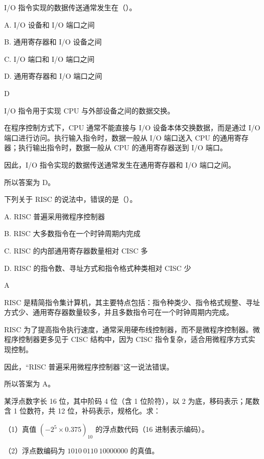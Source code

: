 \begin{question}
I/O 指令实现的数据传送通常发生在（）。

A. I/O 设备和 I/O 端口之间

B. 通用寄存器和 I/O 设备之间

C. I/O 端口和 I/O 端口之间

D. 通用寄存器和 I/O 端口之间
\end{question}

\begin{answer}
D
\end{answer}

\begin{analysisenv}
I/O 指令用于实现 CPU 与外部设备之间的数据交换。

在程序控制方式下，CPU 通常不能直接与 I/O 设备本体交换数据，而是通过 I/O 端口进行访问。执行输入指令时，数据一般从 I/O 端口送入 CPU 的通用寄存器；执行输出指令时，数据一般从 CPU 的通用寄存器送到 I/O 端口。

因此，I/O 指令实现的数据传送通常发生在通用寄存器和 I/O 端口之间。

所以答案为 D。
\end{analysisenv}
\begin{question}
下列关于 RISC 的说法中，错误的是（）。

A. RISC 普遍采用微程序控制器

B. RISC 大多数指令在一个时钟周期内完成

C. RISC 的内部通用寄存器数量相对 CISC 多

D. RISC 的指令数、寻址方式和指令格式种类相对 CISC 少
\end{question}

\begin{answer}
A
\end{answer}

\begin{analysisenv}
RISC 是精简指令集计算机，其主要特点包括：指令种类少、指令格式规整、寻址方式少、通用寄存器数量较多，并且多数指令可在一个时钟周期内完成。

RISC 为了提高指令执行速度，通常采用硬布线控制器，而不是微程序控制器。微程序控制器更多见于 CISC 结构中，因为 CISC 指令复杂，适合用微程序方式实现控制。

因此，“RISC 普遍采用微程序控制器”这一说法错误。

所以答案为 A。
\end{analysisenv}


\begin{question}
某浮点数字长 16 位，其中阶码 4 位（含 1 位阶符），以 2 为底，移码表示；尾数含 1 位数符，共 12 位，补码表示，规格化。求：

（1）真值 $(-2^5 \times 0.375)_{10}$ 的浮点数代码（16 进制表示编码）。

（2）浮点数编码为 $1010\ 0110\ 10000000$ 的真值。
\end{question}

